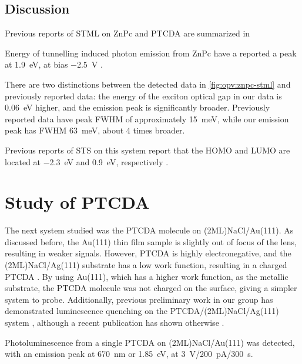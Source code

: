 \subsection{Discussion}

Previous reports of \ac{STML} on ZnPc and PTCDA are summarized in 

Energy of tunnelling induced photon emission from ZnPc have a reported a peak at \SI{1.9}{eV}, at bias \SI{-2.5}{V} \citep{Zhang2016,Zhang2017,Doppagne2017,Doppagne2018}. 

There are two distinctions between the detected data in \autoref{fig:opv:znpc-stml} and previously reported data: the energy of the exciton optical gap in our data is \SI{0.06}{eV} higher, and the emission peak is significantly broader. Previously reported data have peak \ac{FWHM} of approximately \SI{15}{meV}, while our emission peak has \ac{FWHM} \SI{63}{meV}, about 4 times broader.

Previous reports of \ac{STS} on this system report that the \ac{HOMO} and \ac{LUMO} are located at \SI{-2.3}{eV} and \SI{0.9}{eV}, respectively \citep{Doppagne2017}.




\section{Study of {PTCDA}}

The next system studied was the \ac{PTCDA} molecule on (2ML)NaCl/Au(111). As discussed before, the Au(111) thin film sample is slightly out of focus of the lens, resulting in weaker signals. However, \ac{PTCDA} is highly electronegative, and the (2ML)NaCl/Ag(111) substrate has a low work function, resulting in a charged PTCDA \citep{cochrane2017single,cochrane2018molecularly}. By using Au(111), which has a higher work function, as the metallic substrate, the PTCDA molecule was not charged on the surface, giving a simpler system to probe. Additionally, previous preliminary work in our group has demonstrated luminescence quenching on the PTCDA/(2ML)NaCl/Ag(111) system \citep{roussy2016coupling}, although a recent publication has shown otherwise \citep{Kimura2019}.

Photoluminescence from a single PTCDA on (2ML)NaCl/Au(111) was detected, with an emission peak at \SI{670}{nm} or \SI{1.85}{eV}, at \SI{3}{V}/\SI{200}{pA}/\SI{300}{s}.


